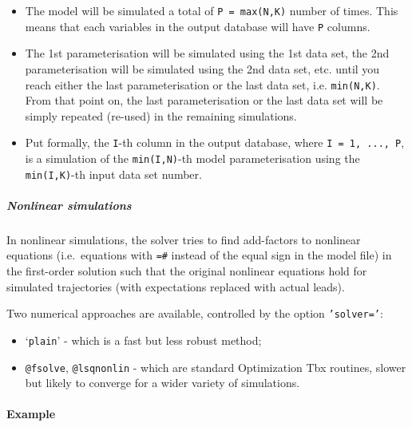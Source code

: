 \begin{itemize}
\item
  The model will be simulated a total of \texttt{P = max(N,K)} number of
  times. This means that each variables in the output database will have
  \texttt{P} columns.
\item
  The 1st parameterisation will be simulated using the 1st data set, the
  2nd parameterisation will be simulated using the 2nd data set, etc.
  until you reach either the last parameterisation or the last data set,
  i.e. \texttt{min(N,K)}. From that point on, the last parameterisation
  or the last data set will be simply repeated (re-used) in the
  remaining simulations.
\item
  Put formally, the \texttt{I}-th column in the output database, where
  \texttt{I = 1, ..., P}, is a simulation of the \texttt{min(I,N)}-th
  model parameterisation using the \texttt{min(I,K)}-th input data set
  number.
\end{itemize}

\subparagraph{Nonlinear simulations}

In nonlinear simulations, the solver tries to find add-factors to
nonlinear equations (i.e.~equations with \texttt{=\#} instead of the
equal sign in the model file) in the first-order solution such that the
original nonlinear equations hold for simulated trajectories (with
expectations replaced with actual leads).

Two numerical approaches are available, controlled by the option
\texttt{'solver='}:

\begin{itemize}
\item
  `\texttt{plain}' - which is a fast but less robust method;
\item
  \texttt{@fsolve}, \texttt{@lsqnonlin} - which are standard
  Optimization Tbx routines, slower but likely to converge for a wider
  variety of simulations.
\end{itemize}

\paragraph{Example}


